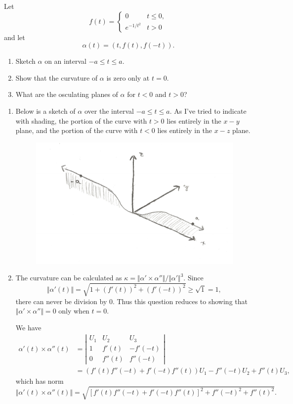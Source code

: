 \documentclass[10pt]{report}
\begin{document}
\begin{exer}[2.4: 16]
Let
\[
	f(t) =
	\begin{cases}
		0 & t \leq 0,\\
		e^{-1/t^2} & t > 0
	\end{cases}
\] and let
\[
	\alpha(t) = (t, f(t), f(-t)).
\]
\begin{enumerate}
	\item Sketch $\alpha$ on an interval $-a \leq t \leq a$.
	\item Show that the curvature of $\alpha$ is zero only at $t=0$.
	\item What are the osculating planes of $\alpha$ for $t < 0 $ and $t>0$?
\end{enumerate}
\end{exer}
\begin{enumerate}
	\item Below is a sketch of $\alpha$ over the interval $-a \leq t \leq a$. As I've tried to indicate with shading, the portion of the curve with $t>0$ lies entirely in the $x-y$ plane, and the portion of the curve with $t<0$ lies entirely in the $x-z$ plane.
		\begin{figure}[H]
			\centering
			\includegraphics[scale=0.9]{fig/curve.pdf}
		\end{figure}
		

	\item The curvature can be calculated as $\kappa=\Vert{\alpha' \times \alpha''}\Vert/\Vert{\alpha'}\Vert^3$. Since
		\[
			\Vert{\alpha'(t)}\Vert = \sqrt{1 + (f'(t))^2 + (f'(-t))^2} \geq \sqrt{1} =1,
		\] there can never be division by 0. Thus this question reduces to showing that $\Vert{\alpha' \times \alpha''}\Vert=0$ only when $t=0$.

		We have
		\begin{align*}
			\alpha'(t) \times \alpha''(t) &= \left| 
			\begin{matrix}
				U_1 & U_2 & U_3 \\
				1 & f'(t) & -f'(-t) \\
				0 & f''(t) & f''(-t)
			\end{matrix}\right| \\
						      &= \left( f'(t)f''(-t) + f'(-t)f''(t) \right)U_1 - f''(-t)U_2 + f''(t)U_3,
		\end{align*}
		which has norm
		\[
			\Vert{\alpha'(t)\times \alpha''(t)}\Vert = \sqrt{[f'(t)f''(-t) + f'(-t)f''(t)]^2 + f''(-t)^2 + f''(t)^2} .
		\] 


\end{enumerate}
\end{document}
